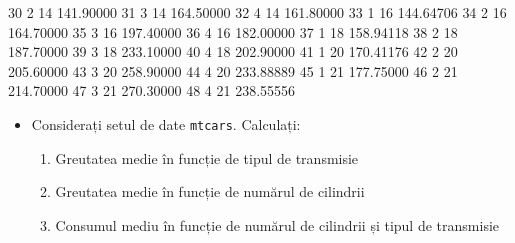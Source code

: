 \documentclass[]{article}
\newenvironment{Shaded}{\begin{snugshade}}{\end{snugshade}}
\newcommand{\DecValTok}[1]{\textcolor[rgb]{0.00,0.00,0.81}{#1}}
\newcommand{\FloatTok}[1]{\textcolor[rgb]{0.00,0.00,0.81}{#1}}
\newenvironment{frshaded*}{%
  \def\FrameCommand{\fboxrule=\FrameRule\fboxsep=\FrameSep \fcolorbox{framecolor}{shadecolor1}}%
  \MakeFramed {\advance\hsize-\width \FrameRestore}}%
{\endMakeFramed}
\newenvironment{rmdblock}[1]
  {\begin{frshaded*}
  \begin{itemize}
  \renewcommand{\labelitemi}{
    \raisebox{-.7\height}[0pt][0pt]{
      {\setkeys{Gin}{width=2em,keepaspectratio}\texttt{[image: images/icons/\#1]}}
    }
  }
  \item
  }
  {
  \end{itemize}
  \end{frshaded*}
  }
\newenvironment{rmdexercise}
  {\begin{rmdblock}{exercise}}
  {\end{rmdblock}}
\renewcommand\refname{Referințe}
\begin{document}
\begin{Shaded}
\begin{Highlighting}[]
\DecValTok{30}    \DecValTok{2}   \DecValTok{14} \FloatTok{141.90000}
\DecValTok{31}    \DecValTok{3}   \DecValTok{14} \FloatTok{164.50000}
\DecValTok{32}    \DecValTok{4}   \DecValTok{14} \FloatTok{161.80000}
\DecValTok{33}    \DecValTok{1}   \DecValTok{16} \FloatTok{144.64706}
\DecValTok{34}    \DecValTok{2}   \DecValTok{16} \FloatTok{164.70000}
\DecValTok{35}    \DecValTok{3}   \DecValTok{16} \FloatTok{197.40000}
\DecValTok{36}    \DecValTok{4}   \DecValTok{16} \FloatTok{182.00000}
\DecValTok{37}    \DecValTok{1}   \DecValTok{18} \FloatTok{158.94118}
\DecValTok{38}    \DecValTok{2}   \DecValTok{18} \FloatTok{187.70000}
\DecValTok{39}    \DecValTok{3}   \DecValTok{18} \FloatTok{233.10000}
\DecValTok{40}    \DecValTok{4}   \DecValTok{18} \FloatTok{202.90000}
\DecValTok{41}    \DecValTok{1}   \DecValTok{20} \FloatTok{170.41176}
\DecValTok{42}    \DecValTok{2}   \DecValTok{20} \FloatTok{205.60000}
\DecValTok{43}    \DecValTok{3}   \DecValTok{20} \FloatTok{258.90000}
\DecValTok{44}    \DecValTok{4}   \DecValTok{20} \FloatTok{233.88889}
\DecValTok{45}    \DecValTok{1}   \DecValTok{21} \FloatTok{177.75000}
\DecValTok{46}    \DecValTok{2}   \DecValTok{21} \FloatTok{214.70000}
\DecValTok{47}    \DecValTok{3}   \DecValTok{21} \FloatTok{270.30000}
\DecValTok{48}    \DecValTok{4}   \DecValTok{21} \FloatTok{238.55556}
\end{Highlighting}
\end{Shaded}

\begin{rmdexercise}
Considerați setul de date \texttt{mtcars}. Calculați:

\begin{enumerate}
\def\labelenumi{\alph{enumi})}
\item
  Greutatea medie în funcție de tipul de transmisie
\item
  Greutatea medie în funcție de numărul de cilindrii
\item
  Consumul mediu în funcție de numărul de cilindrii și tipul de
  transmisie
\end{enumerate}
\end{rmdexercise}

\renewcommand\refname{Referințe}

\end{document}
